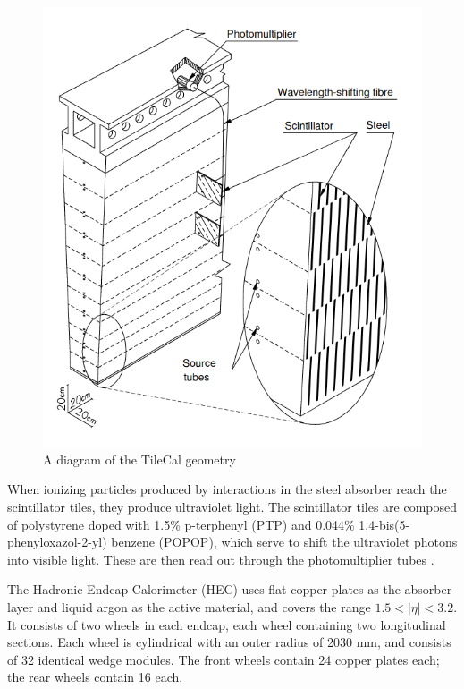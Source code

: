 \begin{figure}
  \includegraphics[width=\linewidth]{figures/detector_chapter/TileCal.png}
  \caption{A diagram of the TileCal geometry \cite{ATLAS_Jinst}}
  \label{fig:TileCalDiagram}
\end{figure}

When ionizing particles produced by interactions in the steel absorber reach the scintillator tiles, they produce ultraviolet light. The scintillator tiles are composed of polystyrene doped with 1.5\%  p-terphenyl (PTP) and 0.044\% 1,4-bis(5-phenyloxazol-2-yl) benzene (POPOP), which serve to shift the ultraviolet photons into visible light. These are then read out through the photomultiplier tubes \cite{ATLAS_TDR}.

The Hadronic Endcap Calorimeter (HEC) uses flat copper plates as the absorber layer and liquid argon as the active material, and covers the range  $1.5 < | \eta | < 3.2 $. It consists of two wheels in each endcap, each wheel containing two longitudinal sections. Each wheel is cylindrical with an outer radius of 2030 mm, and consists of 32 identical wedge modules. The front wheels contain 24 copper plates each; the rear wheels contain 16 each.

